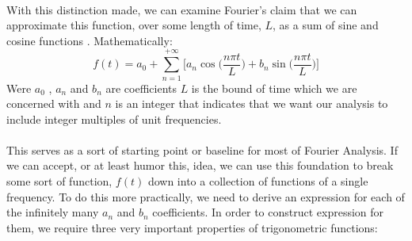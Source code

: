 \documentclass[12pt,letterpaper]{article}
\begin{document}
\paragraph*{}With this distinction made, we can examine Fourier's claim that we can approximate this function, over some length of time, $L$, as a sum of sine and cosine functions \cite{Pinsky,Tolstov}. Mathematically:
\begin{equation}
\label{Series Def}
f(t) = a_0 + \sum_{n=1}^{+\infty} \Bigg[ a_n \cos\Big(\frac{n\pi t}{L}\Big) + b_n \sin\Big(\frac{n\pi t}{L}\Big) \Bigg]
\end{equation}
Were $a_0$ , $a_n$ and $b_n$ are coefficients $L$ is the bound of time which we are concerned with and $n$ is an integer that indicates that we want our analysis to include integer multiples of unit frequencies.
\paragraph*{}This serves as a sort of starting point or baseline for most of Fourier Analysis. If we can accept, or at least humor this, idea, we can use this foundation to break some sort of function, $f(t)$ down into a collection of functions of a single frequency. To do this more practically, we need to derive an expression for each of the infinitely many $a_n$ and $b_n$ coefficients. In order to construct expression for them, we require three very important properties of trigonometric functions:
\end{document}
